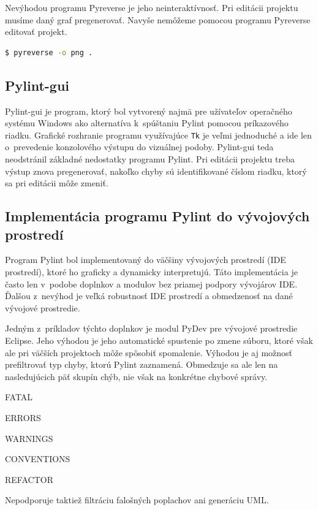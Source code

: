 \documentclass[11pt,oneside,final]{fithesis2}
\begin{document}
		Nevýhodou programu Pyreverse je jeho neinteraktívnosť. Pri editácii projektu musíme daný graf pregenerovať. Navyše nemôžeme pomocou programu Pyreverse editovať projekt.		
		
\begin{lstlisting}[language=bash]
$ pyreverse -o png .
\end{lstlisting}
 
 
	\subsection{Pylint-gui}
	
	Pylint-gui je program, ktorý bol vytvorený najmä pre užívateľov operačného systému Windows ako alternatíva k~spúštaniu Pylint pomocou príkazového riadku. Grafické rozhranie programu využívajúce \texttt{Tk} je veľmi jednoduché a ide len o~prevedenie konzolového výstupu do vizuálnej podoby. Pylint-gui teda neodstránil základné nedostatky programu Pylint. Pri editácii projektu treba výstup znova pregenerovať, nakoľko chyby sú identifikované číslom riadku, ktorý sa pri editácii môže zmeniť.
	
	\subsection{Implementácia programu Pylint do vývojových prostredí}
 
	Program Pylint bol implementovaný do väčšiny vývojových prostredí (IDE prostredí), ktoré ho graficky a dynamicky interpretujú. Táto implementácia je často len v~podobe doplnkov a modulov bez priamej podpory vývojárov IDE. Ďalšou z~nevýhod je veľká robustnosť IDE prostredí a obmedzenosť na dané vývojové prostredie. 
	
	Jedným z~príkladov týchto doplnkov je modul PyDev\cite{pydev} pre vývojové prostredie Eclipse. Jeho výhodou je jeho automatické spustenie po zmene súboru, ktoré však ale pri väčších projektoch môže spôsobiť spomalenie. Výhodou je aj možnosť prefiltrovať typ chyby, ktorú Pylint zaznamená. Obmedzuje sa ale len na nasledujúcich päť skupín chýb, nie však na konkrétne chybové správy.

\begin{list}{•}{}
\item FATAL
\item ERRORS
\item WARNINGS
\item CONVENTIONS
\item REFACTOR
\end{list}
Nepodporuje taktiež filtráciu falošných poplachov ani generáciu UML.
	
\end{document}

